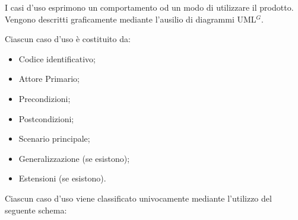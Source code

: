 

    I casi d’uso esprimono un comportamento od un modo di utilizzare il prodotto. \\
    Vengono descritti graficamente mediante l’ausilio di diagrammi UML$^{G}$. 

    Ciascun caso d’uso è costituito da:
    \begin{itemize}
        \item Codice identificativo;
        \item Attore Primario;
        \item Precondizioni;
        \item Postcondizioni;
        \item Scenario principale;
        \item Generalizzazione (se esistono);
        \item Estensioni (se esistono).
        
    \end{itemize}


    Ciascun caso d’uso viene classificato univocamente mediante l’utilizzo del seguente schema:
    

 